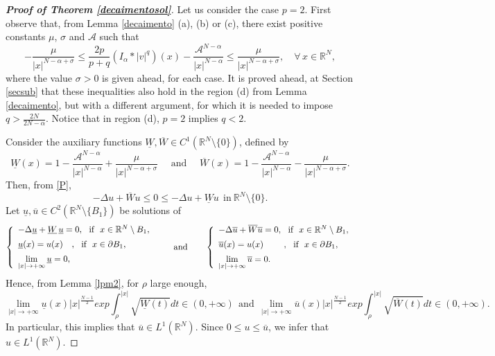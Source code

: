 \documentclass[12pt,a4paper]{article}
\numberwithin{equation}{section}
\begin{document}
\begin{proof}[\textbf{Proof of Theorem \ref{decaimentosol}}] Let us consider the case $p=2$. First observe that, from Lemma \ref{decaimento} (a), (b) or (c), there exist positive constants $\mu$, $\sigma$ and $\mathcal{A}$ such that
    $$
    -\dfrac{\mu}{|x|^{N-\alpha+\sigma}} \leq \dfrac{2p}{p+q}(I_\alpha \ast |v|^q)(x) - \dfrac{\mathcal{A}^{N-\alpha}}{|x|^{N-\alpha}}\leq \dfrac{\mu}{|x|^{N-\alpha+\sigma}}, \quad \forall \, x \in \mathbb{R}^N,
$$
where the value $\sigma>0$ is given ahead, for each case. It is proved ahead, at Section \ref{secsub} that these inequalities also hold in the region (d) from Lemma \ref{decaimento}, but with a different argument, for which it is needed to impose $q > \frac{2N}{2N-\alpha}$. Notice that in region (d), $p=2$ implies $q<2$.

Consider the auxiliary functions $\underline{W}, \overline{W}\in C^1(\mathbb{R}^N \setminus \{0\})$, defined by
    $$
    \underline{W}(x) = 1 - \dfrac{\mathcal{A}^{N-\alpha}}{|x|^{N-\alpha}} + \dfrac{\mu}{|x|^{N-\alpha+\sigma}} \quad \mbox{ and } \quad \overline{W}(x) = 1 - \dfrac{\mathcal{A}^{N-\alpha}}{|x|^{N-\alpha}} - \dfrac{\mu}{|x|^{N-\alpha+\sigma}}.
    $$
    Then, from \eqref{P},
    $$
    -\Delta u + \overline{W}u \leq 0 \leq -\Delta u + \underline{W}u \ \ \text{in} \ \mathbb{R}^N \setminus \{0\}.
    $$
Let $\underline{u}, \overline{u}\in C^2(\mathbb{R}^N \setminus \{B_1\})$ be solutions of 
    $$
    \left\{
    \begin{array}{lll}
         -\Delta \underline{u}+ \underline{W}\, \underline{u}= 0, \mbox{ \ if \ } x \in \mathbb{R}^N \setminus B_1, \vspace{5pt}\\
        \underline{u}(x) = u(x) \ \ \ ,  \mbox{ \ if \ } x \in \partial B_1, \vspace{5pt}\\
        \lim\limits_{|x|\rightarrow + \infty}\underline{u} = 0,
    \end{array}
    \right.
   \qquad \text{and} \qquad
    \left\{
    \begin{array}{lll}
         -\Delta \overline{u}+ \overline{W}\overline{u}= 0, \mbox{ \ if \ } x \in \mathbb{R}^N \setminus B_1, \vspace{5pt}\\
        \overline{u}(x) = u(x) \ \ \ \ \ \ \ ,  \mbox{ \ if \ } x \in \partial B_1, \vspace{5pt}\\
        \lim\limits_{|x|\rightarrow + \infty}\overline{u} = 0.
    \end{array}
    \right.
    $$
Hence, from Lemma \ref{lpm2}, for $\rho$ large enough,
    $$
    \lim\limits_{|x|\rightarrow +\infty}\!\underline{u}(x)|x|^{\frac{N-1}{2}} exp\int_{\rho}^{|x|}\!\!\!\sqrt{\underline{W}(t)} dt \in (0, +\infty) \ \ \text{and} \ \   \lim\limits_{|x|\rightarrow +\infty}\!\overline{u}(x)|x|^{\frac{N-1}{2}}exp\int_{\rho}^{|x|}\!\!\!\sqrt{\overline{W}(t)} dt \in (0, +\infty).
    $$
    In particular, this implies that $\overline{u} \in L^1(\mathbb{R}^N)$. Since $0 \leq u \leq \overline{u}$, we infer that $u \in L^1(\mathbb{R}^N)$.


\end{proof}
\end{document}
